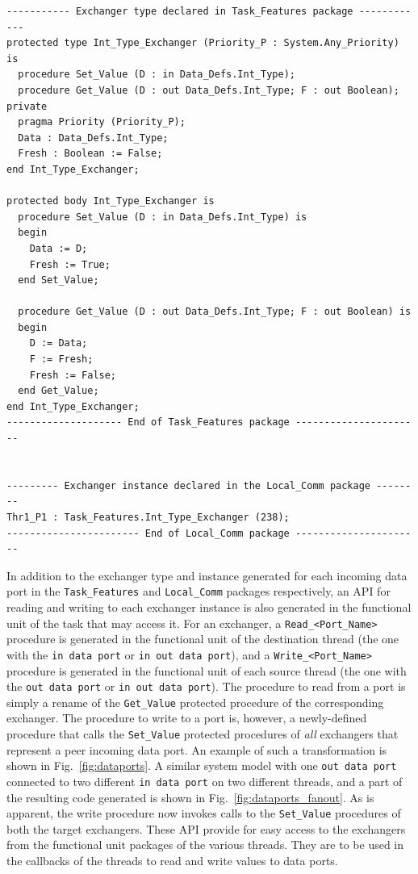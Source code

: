 \begin{minipage}{\listingwidth}
\lstset{language=ada}
\begin{lstlisting}[label=exchangerSpec,caption=The
\texttt{Int\_Type\_Exchanger} generated type]
----------- Exchanger type declared in Task_Features package ------------
protected type Int_Type_Exchanger (Priority_P : System.Any_Priority) is  
  procedure Set_Value (D : in Data_Defs.Int_Type);                       
  procedure Get_Value (D : out Data_Defs.Int_Type; F : out Boolean);     
private
  pragma Priority (Priority_P);
  Data : Data_Defs.Int_Type;
  Fresh : Boolean := False;
end Int_Type_Exchanger;

protected body Int_Type_Exchanger is
  procedure Set_Value (D : in Data_Defs.Int_Type) is
  begin
    Data := D; 
    Fresh := True;
  end Set_Value;

  procedure Get_Value (D : out Data_Defs.Int_Type; F : out Boolean) is
  begin
    D := Data; 
    F := Fresh; 
    Fresh := False;
  end Get_Value;
end Int_Type_Exchanger;
-------------------- End of Task_Features package ----------------------


--------- Exchanger instance declared in the Local_Comm package --------
Thr1_P1 : Task_Features.Int_Type_Exchanger (238);
----------------------- End of Local_Comm package ----------------------
\end{lstlisting}
\end{minipage}

In addition to the exchanger type and instance generated for each
incoming data port in the \texttt{Task\_Features} and
\texttt{Local\_Comm} packages respectively, an API for reading and
writing to each exchanger instance is also generated in the functional
unit of the task that may access it. For an exchanger, a
\texttt{Read\_<Port\_Name>} procedure is generated in the functional
unit of the destination thread (the one with the \texttt{in data port}
or \texttt{in out data port}), and a \texttt{Write\_<Port\_Name>}
procedure is generated in the functional unit of each source thread
(the one with the \texttt{out data port} or \texttt{in out data
  port}). The procedure to read from a port is simply a rename of the
\texttt{Get\_Value} protected procedure of the corresponding
exchanger. The procedure to write to a port is, however, a
newly-defined procedure that calls the \texttt{Set\_Value} protected
procedures of \emph{all} exchangers that represent a peer incoming
data port. An example of such a transformation is shown in
Fig.~\ref{fig:dataports}. A similar system model with one \texttt{out
  data port} connected to two different \texttt{in data port} on two
different threads, and a part of the resulting code generated is shown
in Fig.~\ref{fig:dataports_fanout}. As is apparent, the write
procedure now invokes calls to the \texttt{Set\_Value} procedures of
both the target exchangers. These API provide for easy access to the
exchangers from the functional unit packages of the various
threads. They are to be used in the callbacks of the threads to read
and write values to data ports.

